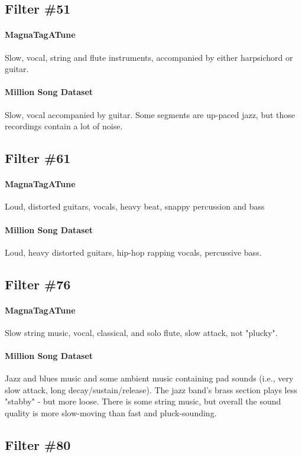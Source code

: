 \subsection*{Filter \#51}
\paragraph{MagnaTagATune}
Slow, vocal, string and flute instruments, accompanied by either harpsichord or guitar.
\paragraph{Million Song Dataset}
Slow, vocal accompanied by guitar. Some segments are up-paced jazz, but those recordings contain a lot of noise.

\subsection*{Filter \#61}
\paragraph{MagnaTagATune}
Loud, distorted guitars, vocals, heavy beat, snappy percussion and bass
\paragraph{Million Song Dataset}
Loud, heavy distorted guitars, hip-hop rapping vocals, percussive bass.

\subsection*{Filter \#76}
\paragraph{MagnaTagATune}
Slow string music, vocal, classical, and solo flute, slow attack, not "plucky".

\paragraph{Million Song Dataset}
Jazz and blues music and some ambient music containing pad sounds (i.e., very slow attack, long decay/sustain/release). The jazz band's brass section plays less "stabby" - but more loose. There is some string music, but overall the sound quality is more slow-moving than fast and pluck-sounding.


\subsection*{Filter \#80}
